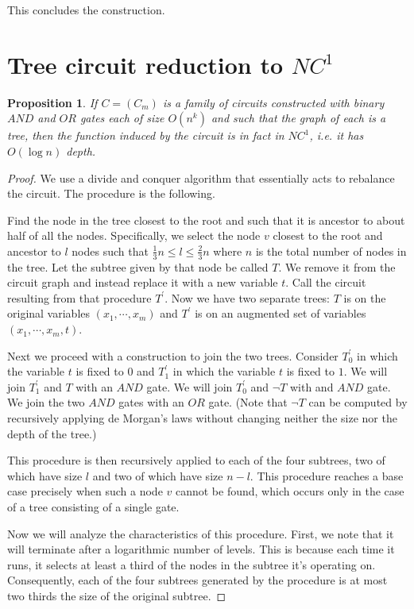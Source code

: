 \documentclass[11pt,letterpaper]{article}
\newtheorem{proposition}{Proposition}
\begin{document}
This concludes the construction.

\section{Tree circuit reduction to $NC^1$}

\begin{proposition}
    If $C = (C_m)$ is a family of circuits constructed with binary $AND$ and
    $OR$ gates each of size $O(n^k)$ and such that the graph of each is a tree,
    then the function induced by the circuit is in fact in $NC^1$, i.e. it has
    $O(\log n)$ depth.
\end{proposition}

\begin{proof}
    We use a divide and conquer algorithm that essentially acts to rebalance
    the circuit. The procedure is the following.

    Find the node in the tree closest to the root and such that it is ancestor
    to about half of all the nodes. Specifically, we select the node $v$
    closest to the root and ancestor to $l$ nodes such that $\frac{1}{3}n \leq
    l \leq \frac{2}{3}n$ where $n$ is the total number of nodes in the tree.
    Let the subtree given by that node be called $T$. We remove it from the
    circuit graph and instead replace it with a new variable $t$. Call the
    circuit resulting from that procedure $T^\prime$. Now we have two separate
    trees: $T$ is on the original variables $(x_1, \cdots, x_m)$ and $T^\prime$
    is on an augmented set of variables $(x_1, \cdots, x_m, t)$.

    Next we proceed with a construction to join the two trees. Consider
    $T_0^\prime$ in which the variable $t$ is fixed to $0$ and $T_1^\prime$ in
    which the variable $t$ is fixed to $1$. We will join $T_1^\prime$ and $T$
    with an $AND$ gate. We will join $T_0^\prime$ and $\neg T$ with and $AND$
    gate. We join the two $AND$ gates with an $OR$ gate. (Note that $\neg T$
    can be computed by recursively applying de Morgan's laws without changing
    neither the size nor the depth of the tree.)

    This procedure is then recursively applied to each of the four subtrees,
    two of which have size $l$ and two of which have size $n - l$. This
    procedure reaches a base case precisely when such a node $v$ cannot be
    found, which occurs only in the case of a tree consisting of a single gate.

    Now we will analyze the characteristics of this procedure. First, we note
    that it will terminate after a logarithmic number of levels. This is
    because each time it runs, it selects at least a third of the nodes in the
    subtree it's operating on. Consequently, each of the four subtrees
    generated by the procedure is at most two thirds the size of the original
    subtree.


\end{proof}
\end{document}
